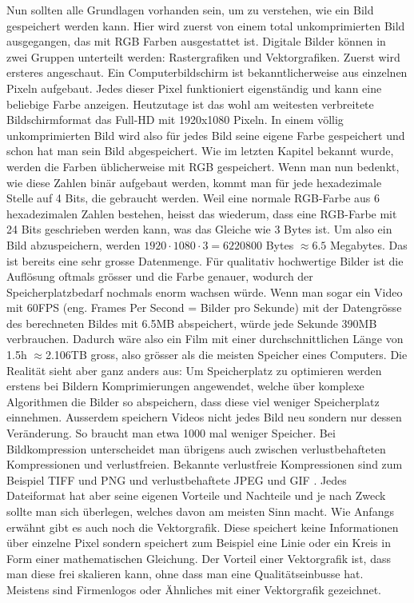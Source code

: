 Nun sollten alle Grundlagen vorhanden sein, um zu verstehen, wie ein Bild gespeichert werden kann. Hier wird zuerst von einem total unkomprimierten Bild ausgegangen, das mit RGB Farben ausgestattet ist. Digitale Bilder können in zwei Gruppen unterteilt werden: Rastergrafiken und Vektorgrafiken. Zuerst wird ersteres angeschaut. Ein Computerbildschirm ist bekanntlicherweise aus einzelnen Pixeln aufgebaut. Jedes dieser Pixel funktioniert eigenständig und kann eine beliebige Farbe anzeigen. Heutzutage ist das wohl am weitesten verbreitete Bildschirmformat das Full-HD mit 1920x1080 Pixeln. In einem völlig unkomprimierten Bild wird also für jedes Bild seine eigene Farbe gespeichert und schon hat man sein Bild abgespeichert. Wie im letzten Kapitel bekannt wurde, werden die Farben üblicherweise mit RGB gespeichert. Wenn man nun bedenkt, wie diese Zahlen binär aufgebaut werden, kommt man für jede hexadezimale Stelle auf 4 Bits, die gebraucht werden. Weil eine normale RGB-Farbe aus 6 hexadezimalen Zahlen bestehen, heisst das wiederum, dass eine RGB-Farbe mit 24 Bits geschrieben werden kann, was das Gleiche wie 3 Bytes ist. Um also ein Bild abzuspeichern, werden $1920 \cdot 1080 \cdot 3=6220800$ Bytes $ \approx  6.5$ Megabytes. Das ist bereits eine sehr grosse Datenmenge. Für qualitativ hochwertige Bilder ist die Auflösung oftmals grösser und die Farbe genauer, wodurch der Speicherplatzbedarf nochmals enorm wachsen würde. Wenn man sogar ein Video mit 60FPS (eng. Frames Per Second = Bilder pro Sekunde) mit der Datengrösse des berechneten Bildes mit 6.5MB abspeichert, würde jede Sekunde 390MB verbrauchen. Dadurch wäre also ein Film mit einer durchschnittlichen Länge von 1.5h $ \approx$2.106TB gross, also grösser als die meisten Speicher eines Computers. Die Realität sieht aber ganz anders aus: Um Speicherplatz zu optimieren werden erstens bei Bildern Komprimierungen angewendet, welche über komplexe Algorithmen die Bilder so abspeichern, dass diese viel weniger Speicherplatz einnehmen. Ausserdem speichern Videos nicht jedes Bild neu sondern nur dessen Veränderung. So braucht man etwa 1000 mal weniger Speicher. Bei Bildkompression unterscheidet man übrigens auch zwischen verlustbehafteten Kompressionen und verlustfreien. Bekannte verlustfreie Kompressionen sind zum Beispiel TIFF und PNG und verlustbehaftete JPEG und GIF \cite{Dateiformate}. Jedes Dateiformat hat aber seine eigenen Vorteile und Nachteile und je nach Zweck sollte man sich überlegen, welches davon am meisten Sinn macht. Wie Anfangs erwähnt gibt es auch noch die Vektorgrafik. Diese speichert keine Informationen über einzelne Pixel sondern speichert zum Beispiel eine Linie oder ein Kreis in Form einer mathematischen Gleichung. Der Vorteil einer Vektorgrafik ist, dass man diese frei skalieren kann, ohne dass man eine Qualitätseinbusse hat. Meistens sind Firmenlogos oder Ähnliches mit einer Vektorgrafik gezeichnet.


